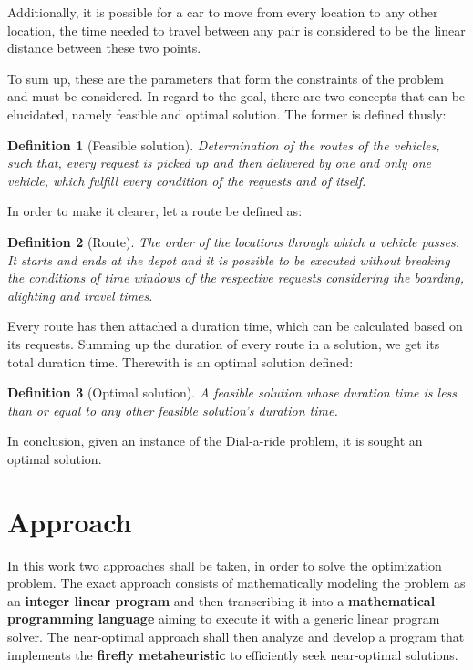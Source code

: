 \documentclass[tuberlin,cic,tc,openright,english,noabntcite,oneside]{iiufrgs}
\newtheorem{definition}{Definition}
\begin{document}
Additionally, it is possible for a car to move from every location to any other location, the time needed to travel between any pair is considered to be the linear distance between these two points.

To sum up, these are the parameters that form the constraints of the problem and must be considered. In regard to the goal, there are two concepts that can be elucidated, namely feasible and optimal solution. The former is defined thusly:
\begin{definition}[Feasible solution]
Determination of the routes of the vehicles, such that, every request is picked up and then delivered by one and only one vehicle, which fulfill every condition of the requests and of itself.
\end{definition}

In order to make it clearer, let a route be defined as:
\begin{definition}[Route]
The order of the locations through which a vehicle passes. It starts and ends at the depot and it is possible to be executed without breaking the conditions of time windows of the respective requests considering the boarding, alighting and travel times.
\end{definition}

Every route has then attached a duration time, which can be calculated based on its requests. Summing up the duration of every route in a solution, we get its total duration time. Therewith is an optimal solution defined:
\begin{definition}[Optimal solution]
A feasible solution whose duration time is less than or equal to any other feasible solution's duration time.
\end{definition}

In conclusion, given an instance of the Dial-a-ride problem, it is sought an optimal solution.

\section{Approach}
In this work two approaches shall be taken, in order to solve the optimization problem. The exact approach consists of mathematically modeling the problem as an \textbf{integer linear program} and then transcribing it into a \textbf{mathematical programming language} aiming to execute it with a generic linear program solver. The near-optimal approach shall then analyze and develop a program that implements the \textbf{firefly metaheuristic} to efficiently seek near-optimal solutions.
\end{document}
